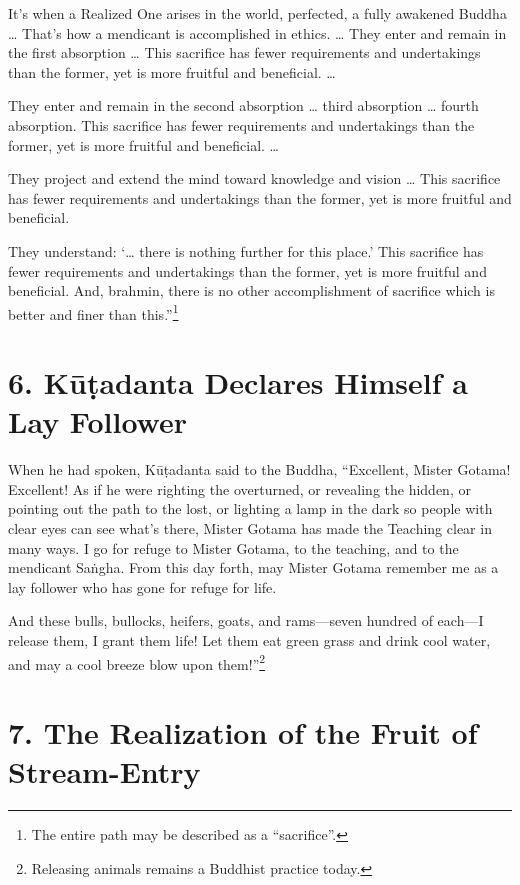 \documentclass[12pt,openany]{book}%
\begin{document}
It’s when a Realized One arises in the world, perfected, a fully awakened Buddha … That’s how a mendicant is accomplished in ethics. … They enter and remain in the first absorption … This sacrifice has fewer requirements and undertakings than the former, yet is more fruitful and beneficial. … 

They enter and remain in the second absorption … third absorption … fourth absorption. This sacrifice has fewer requirements and undertakings than the former, yet is more fruitful and beneficial. … 

They project and extend the mind toward knowledge and vision … This sacrifice has fewer requirements and undertakings than the former, yet is more fruitful and beneficial. 

They understand: ‘… there is nothing further for this place.’ This sacrifice has fewer requirements and undertakings than the former, yet is more fruitful and beneficial. And, brahmin, there is no other accomplishment of sacrifice which is better and finer than this.”\footnote{The entire path may be described as a “sacrifice”. } 

\section*{6. \textsanskrit{Kūṭadanta} Declares Himself a Lay Follower }

When he had spoken, \textsanskrit{Kūṭadanta} said to the Buddha, “Excellent, Mister Gotama! Excellent! As if he were righting the overturned, or revealing the hidden, or pointing out the path to the lost, or lighting a lamp in the dark so people with clear eyes can see what’s there, Mister Gotama has made the Teaching clear in many ways. I go for refuge to Mister Gotama, to the teaching, and to the mendicant \textsanskrit{Saṅgha}. From this day forth, may Mister Gotama remember me as a lay follower who has gone for refuge for life. 

And these bulls, bullocks, heifers, goats, and rams—seven hundred of each—I release them, I grant them life! Let them eat green grass and drink cool water, and may a cool breeze blow upon them!”\footnote{Releasing animals remains a Buddhist practice today. } 

\section*{7. The Realization of the Fruit of Stream-Entry }
\end{document}
